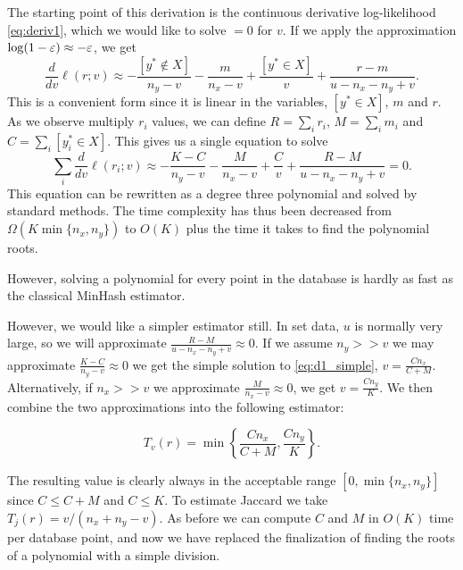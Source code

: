 The starting point of this derivation is the continuous derivative log-likelihood \cref{eq:deriv1},
which we would like to solve $=0$ for $v$.
If we apply the approximation $\log(1-\varepsilon) \approx -\varepsilon$,
we get
\[
   \frac{d}{dv}\ell(r;v) \approx
   -\frac{[y^*\not\in X]}{n_y-v} 
   -\frac{m}{n_x-v} 
   +\frac{[y^*\in X]}{v} 
   +\frac{r-m}{u-n_x-n_y+v} 
   .
\]
This is a convenient form since it is linear in the variables, $[y^*\in X]$, $m$ and $r$.
As we observe multiply $r_i$ values, we can define
$R = \sum_i r_i$, $M = \sum_i m_i$ and $C = \sum_i [y_i^*\in X]$.
This gives us a single equation to solve
\[
   \sum_i\frac{d}{dv}\ell(r_i; v) \approx
   -\frac{K-C}{n_y-v} 
   -\frac{M}{n_x-v} 
   +\frac{C}{v} 
   +\frac{R-M}{u-n_x-n_y+v} 
   = 0
   .
   \label{eq:d1_simple}
\]
This equation can be rewritten as a degree three polynomial and solved by standard methods.
The time complexity has thus been decreased from $\Omega(K\min\{n_x,n_y\})$ to $O(K)$ plus the time it takes to find the polynomial roots.

However, solving a polynomial for every point in the database is hardly as fast as the classical MinHash estimator.

However, we would like a simpler estimator still.
In set data, $u$ is normally very large, so we will approximate $\frac{R-M}{u-n_x-n_y+v}\approx 0$.
If we assume $n_y>\!>v$ we may approximate $\frac{K-C}{n_y-v}\approx 0$ we get the simple solution to \cref{eq:d1_simple}, $v=\frac{C n_x}{C+M}$.
Alternatively, if $n_x>\!>v$ we approximate $\frac{M}{n_x-v}\approx 0$, we get $v=\frac{C n_y}{K}$.
We then combine the two approximations into the following estimator:
\begin{definition}
\[
   T_v(r) = \min\left\{\frac{C n_x}{C+M}, \frac{C n_y}{K}\right\}.
   \label{eq:minner}
\]
\end{definition}

The resulting value is clearly always in the acceptable range $[0,\min\{n_x, n_y\}]$ since $C\le C+M$ and $C \le K$.
To estimate Jaccard we take $T_j(r) = v/(n_x + n_y - v)$.
As before we can compute $C$ and $M$ in $O(K)$ time per database point, and now we have replaced the finalization of finding the roots of a polynomial with a simple division.

\smallskip


